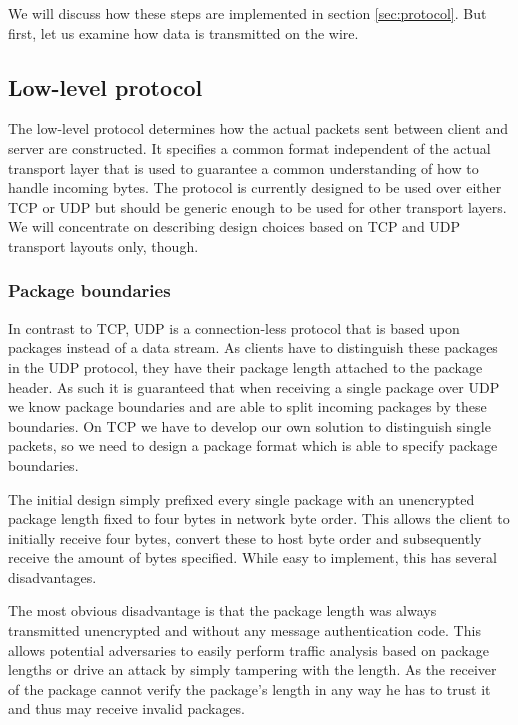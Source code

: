 We will discuss how these steps are implemented in section \ref{sec:protocol}.
But first, let us examine how data is transmitted on the wire.

\subsection{Low-level protocol}
\label{sec:low-level-protocol}

The low-level protocol determines how the actual packets sent between client and server are constructed.
It specifies a common format independent of the actual transport layer that is used to guarantee a common understanding of how to handle incoming bytes.
The protocol is currently designed to be used over either TCP or UDP but should be generic enough to be used for other transport layers.
We will concentrate on describing design choices based on TCP and UDP transport layouts only, though.

\subsubsection{Package boundaries}

In contrast to TCP, UDP is a connection-less protocol that is based upon packages instead of a data stream.
As clients have to distinguish these packages in the UDP protocol, they have their package length attached to the package header.
As such it is guaranteed that when receiving a single package over UDP we know package boundaries and are able to split incoming packages by these boundaries.
On TCP we have to develop our own solution to distinguish single packets, so we need to design a package format which is able to specify package boundaries.

The initial design simply prefixed every single package with an unencrypted package length fixed to four bytes in network byte order.
This allows the client to initially receive four bytes, convert these to host byte order and subsequently receive the amount of bytes specified.
While easy to implement, this has several disadvantages.

The most obvious disadvantage is that the package length was always transmitted unencrypted and without any message authentication code.
This allows potential adversaries to easily perform traffic analysis based on package lengths or drive an attack by simply tampering with the length.
As the receiver of the package cannot verify the package's length in any way he has to trust it and thus may receive invalid packages.

